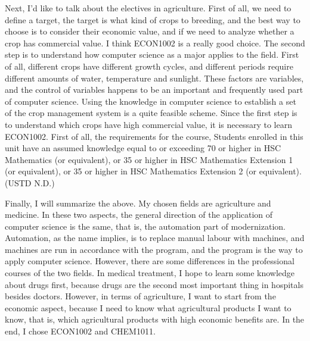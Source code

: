 \documentclass[12pt]{article}
\begin{document}
Next, I'd like to talk about the electives in agriculture. First of all, we need to define a target, the target is what kind of crops to breeding, and the best way to choose is to consider their economic value, and if we need to analyze whether a crop has commercial value. I think ECON1002 is a really good choice. The second step is to understand how computer science as a major applies to the field. First of all, different crops have different growth cycles, and different periods require different amounts of water, temperature and sunlight. These factors are variables, and the control of variables happens to be an important and frequently used part of computer science. Using the knowledge in computer science to establish a set of the crop management system is a quite feasible scheme. Since the first step is to understand which crops have high commercial value, it is necessary to learn ECON1002. First of all, the requirements for the course, Students enrolled in this unit have an assumed knowledge equal to or exceeding 70 or higher in HSC Mathematics (or equivalent), or 35 or higher in HSC Mathematics Extension 1 (or equivalent), or 35 or higher in HSC Mathematics Extension 2 (or equivalent). (USTD N.D.)

Finally, I will summarize the above. My chosen fields are agriculture and medicine. In these two aspects, the general direction of the application of computer science is the same, that is, the automation part of modernization. Automation, as the name implies, is to replace manual labour with machines, and machines are run in accordance with the program, and the program is the way to apply computer science. However, there are some differences in the professional courses of the two fields. In medical treatment, I hope to learn some knowledge about drugs first, because drugs are the second most important thing in hospitals besides doctors. However, in terms of agriculture, I want to start from the economic aspect, because I need to know what agricultural products I want to know, that is, which agricultural products with high economic benefits are. In the end, I chose ECON1002 and CHEM1011.
\end{document}
